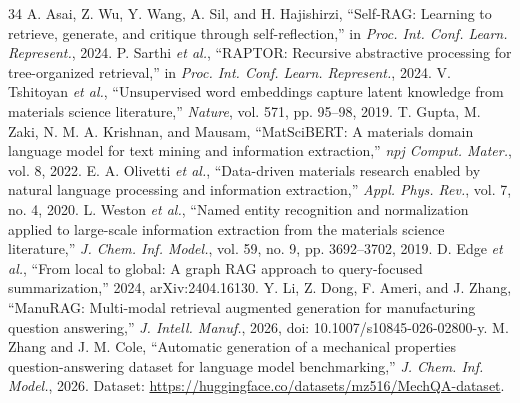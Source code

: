 \documentclass[conference]{IEEEtran}
\begin{document}
\begin{thebibliography}{34}
A. Asai, Z. Wu, Y. Wang, A. Sil, and H. Hajishirzi, ``Self-RAG: Learning to retrieve, generate, and critique through self-reflection,'' in \emph{Proc. Int. Conf. Learn. Represent.}, 2024.
P. Sarthi \emph{et al.}, ``RAPTOR: Recursive abstractive processing for tree-organized retrieval,'' in \emph{Proc. Int. Conf. Learn. Represent.}, 2024.
V. Tshitoyan \emph{et al.}, ``Unsupervised word embeddings capture latent knowledge from materials science literature,'' \emph{Nature}, vol. 571, pp. 95--98, 2019.
T. Gupta, M. Zaki, N. M. A. Krishnan, and Mausam, ``MatSciBERT: A materials domain language model for text mining and information extraction,'' \emph{npj Comput. Mater.}, vol. 8, 2022.
E. A. Olivetti \emph{et al.}, ``Data-driven materials research enabled by natural language processing and information extraction,'' \emph{Appl. Phys. Rev.}, vol. 7, no. 4, 2020.
L. Weston \emph{et al.}, ``Named entity recognition and normalization applied to large-scale information extraction from the materials science literature,'' \emph{J. Chem. Inf. Model.}, vol. 59, no. 9, pp. 3692--3702, 2019.
D. Edge \emph{et al.}, ``From local to global: A graph RAG approach to query-focused summarization,'' 2024, arXiv:2404.16130.
Y. Li, Z. Dong, F. Ameri, and J. Zhang, ``ManuRAG: Multi-modal retrieval augmented generation for manufacturing question answering,'' \emph{J. Intell. Manuf.}, 2026, doi: 10.1007/s10845-026-02800-y.
M. Zhang and J. M. Cole, ``Automatic generation of a mechanical properties question-answering dataset for language model benchmarking,'' \emph{J. Chem. Inf. Model.}, 2026. Dataset: \url{https://huggingface.co/datasets/mz516/MechQA-dataset}.
\end{thebibliography}
\end{document}
